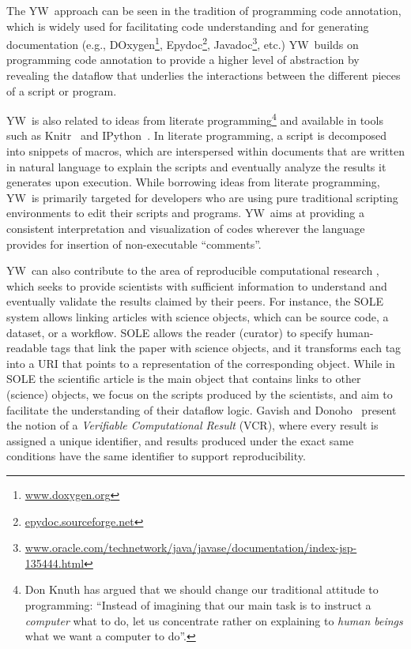 \documentclass{article}
\newcommand{\yw}{\textsf{YW}}
\begin{document}
The \yw\ approach can be seen in the tradition of programming code
annotation, which is widely used for facilitating code understanding
and for generating documentation (e.g.,
DOxygen\footnote{\href{http://www.doxygen.org}{www.doxygen.org}},
Epydoc\footnote{\href{http://epydoc.sourceforge.net}{epydoc.sourceforge.net}},
Javadoc\footnote{\href{http://www.oracle.com/technetwork/java/javase/documentation/index-jsp-135444.html}{www.oracle.com/technetwork/java/javase/documentation/index-jsp-135444.html}
}, etc.) \yw\ builds on programming code annotation to provide a
higher level of abstraction by revealing the dataflow that underlies the
interactions between the different pieces of a script or program.

\yw\ is also related to ideas from literate programming\footnote{Don
  Knuth has argued \cite{knuth1984literate} that we should change our
  traditional attitude to programming: ``Instead of imagining that our
  main task is to instruct a \emph{computer} what to do, let us
  concentrate rather on explaining to \emph{human beings} what we want a
  computer to do''.} and available in tools such as
Knitr~\cite{xie2013dynamic} and IPython~\cite{perez2006ipython}. In
literate programming, a script is decomposed into snippets of macros,
which are interspersed within documents that are written in natural
language to explain the scripts and eventually analyze the results it
generates upon execution. While borrowing ideas from literate
programming, \yw\ is primarily targeted for developers who are using
pure traditional scripting environments to edit their scripts and
programs. \yw\ aims at providing a consistent interpretation and
visualization of codes wherever the language provides for insertion of
non-executable ``comments''.

\yw\ can also contribute to the area of reproducible computational
research \cite{stodden2014implementing}, which seeks to provide
scientists with sufficient information to understand and eventually
validate the results claimed by their peers. For instance, the SOLE
system \cite{pham2012sole} allows linking articles with science
objects, which can be source code, a dataset, or a workflow. SOLE
allows the reader (curator) to specify human-readable tags that link
the paper with science objects, and it transforms each tag into a URI
that points to a representation of the corresponding object. While in
SOLE the scientific article is the main object that contains links to
other (science) objects, we focus on the scripts produced by the
scientists, and aim to facilitate the understanding of their dataflow
logic.  Gavish and Donoho~\cite{gavish2011Universal} present the
notion of a \emph{Verifiable Computational Result} (VCR), where every
result is assigned a unique identifier, and results produced under the
exact same conditions have the same identifier to support
reproducibility.
\end{document}
